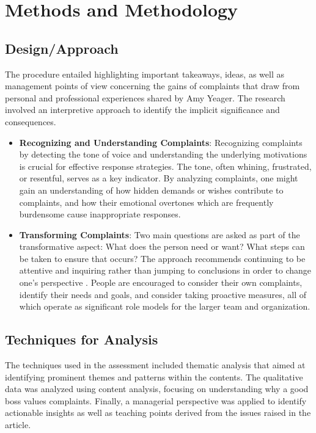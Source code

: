 \documentclass[a4paper,12pt]{report}
\begin{document}
\section{Methods and Methodology}

\subsection{Design/Approach}

The procedure entailed highlighting important takeaways, ideas, as well as management points of view concerning the gains of complaints that draw from personal and professional experiences shared by Amy Yeager. The research involved an interpretive approach to identify the implicit significance and consequences.  

\begin{itemize}
    \item \textbf{Recognizing and Understanding Complaints}: Recognizing complaints by detecting the tone of voice and understanding the underlying motivations is crucial for effective response strategies.  The tone, often whining, frustrated, or resentful, serves as a key indicator\cite{complaint_to_opportunities}.  By analyzing complaints, one might gain an understanding of how hidden demands or wishes contribute to complaints, and how their emotional overtones which are frequently burdensome cause inappropriate responses.
    \item \textbf{Transforming Complaints}: Two main questions are asked as part of the transformative aspect: What does the person need or want? What steps can be taken to ensure that occurs? The approach recommends continuing to be attentive and inquiring rather than jumping to conclusions in order to change one's perspective \cite{complaint_to_opportunities}. People are encouraged to consider their own complaints, identify their needs and goals, and consider taking proactive measures, all of which operate as significant role models for the larger team and organization.
\end{itemize}


\subsection{Techniques for Analysis}
The techniques used in the assessment included thematic analysis that aimed at identifying prominent themes and patterns within the contents. The qualitative data was analyzed using content analysis, focusing on understanding why a good boss values complaints. Finally, a managerial perspective was applied to identify actionable insights as well as teaching points derived from the issues raised in the article.
\end{document}
